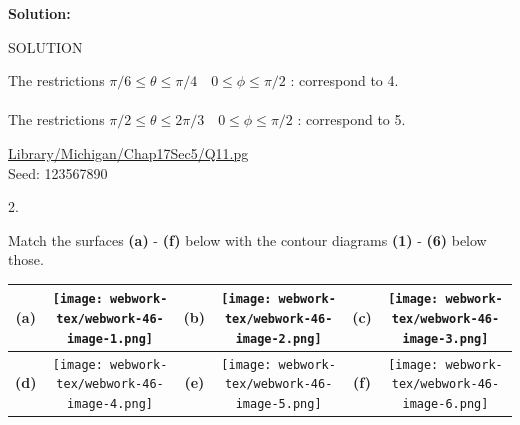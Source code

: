 \documentclass[10pt,]{book}
\theoremstyle{plain}
\theoremstyle{definition}
\theoremstyle{definition}
\theoremstyle{definition}
\theoremstyle{definition}
\theoremstyle{definition}
\numberwithin{equation}{section}
\begin{document}
\begin{exerciselist}
\begin{mdframed}
{\begin{center}
\end{center} 




\par \par {\bf Solution: }\par  SOLUTION \par 

The restrictions
\(\pi/6 \leq\theta\le \pi/4 \quad 0\le\phi\leq \pi/2\) :
correspond to 4.
\leavevmode\\\relax \leavevmode\\\relax 
The restrictions
\(\pi/2 \leq\theta\le 2\pi/3 \quad 0\le\phi\leq \pi/2\) :
correspond to 5. 


\par 
}\par\vspace*{2ex}%
{\tiny\ttfamily\noindent\url{Library/Michigan/Chap17Sec5/Q11.pg}\\Seed: 123567890\hfill}\end{mdframed}
\item[2.]\hypertarget{exercise-46}{}\mbox{}\\ %
\begin{mdframed}
{
Match the surfaces {\bf (a)} - {\bf (f)} below
with the contour diagrams {\bf (1)} - {\bf (6)} below
those.
\leavevmode\\\relax 
\begin{center} 

\par\smallskip\begin{center}\begin{tabular}{|c|c|c|c|c|c|} \hline

{\bf (a)} &\texttt{[image: webwork-tex/webwork-46-image-1.png]}
 &{\bf (b)} &\texttt{[image: webwork-tex/webwork-46-image-2.png]}
 &{\bf (c)} &\texttt{[image: webwork-tex/webwork-46-image-3.png]}
 \\ \hline 

{\bf (d)} &\texttt{[image: webwork-tex/webwork-46-image-4.png]}
 &{\bf (e)} &\texttt{[image: webwork-tex/webwork-46-image-5.png]}
 &{\bf (f)} &\texttt{[image: webwork-tex/webwork-46-image-6.png]}
 \\ \hline 


\end {tabular}\end{center}\par\smallskip


\end{center}}
\end{mdframed}
\end{exerciselist}
\end{document}
